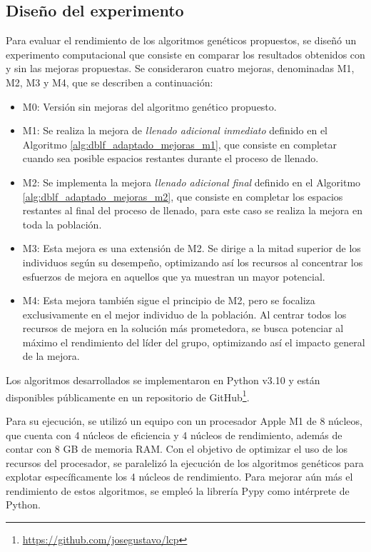 \subsection{Diseño del experimento}

Para evaluar el rendimiento de los algoritmos genéticos propuestos, se diseñó un experimento computacional que consiste en comparar los resultados obtenidos con y sin las mejoras propuestas. Se consideraron cuatro mejoras, denominadas M1, M2, M3 y M4, que se describen a continuación:

\begin{itemize}
    \item M0: Versión sin mejoras del algoritmo genético propuesto.
    \item M1: Se realiza la mejora de \textit{llenado adicional inmediato} definido en el Algoritmo \ref{alg:dblf_adaptado_mejoras_m1}, que consiste en completar cuando sea posible espacios restantes durante el proceso de llenado.
    \item M2: Se implementa la mejora \textit{llenado adicional final} definido en el Algoritmo \ref{alg:dblf_adaptado_mejoras_m2}, que consiste en completar los espacios restantes al final del proceso de llenado, para este caso se realiza la mejora en toda la población.
    \item M3: Esta mejora es una extensión de M2. Se dirige a la mitad superior de los individuos según su desempeño, optimizando así los recursos al concentrar los esfuerzos de mejora en aquellos que ya muestran un mayor potencial.
    \item M4: Esta mejora también sigue el principio de M2, pero se focaliza exclusivamente en el mejor individuo de la población. Al centrar todos los recursos de mejora en la solución más prometedora, se busca potenciar al máximo el rendimiento del líder del grupo, optimizando así el impacto general de la mejora.
\end{itemize}

Los algoritmos desarrollados se implementaron en Python v3.10 y están disponibles públicamente en un repositorio de GitHub\footnote{\url{https://github.com/josegustavo/lcp}}.

Para su ejecución, se utilizó un equipo con un procesador Apple M1 de 8 núcleos, que cuenta con 4 núcleos de eficiencia y 4 núcleos de rendimiento, además de contar con 8 GB de memoria RAM. Con el objetivo de optimizar el uso de los recursos del procesador, se paralelizó la ejecución de los algoritmos genéticos para explotar específicamente los 4 núcleos de rendimiento. Para mejorar aún más el rendimiento de estos algoritmos, se empleó la librería Pypy como intérprete de Python.

